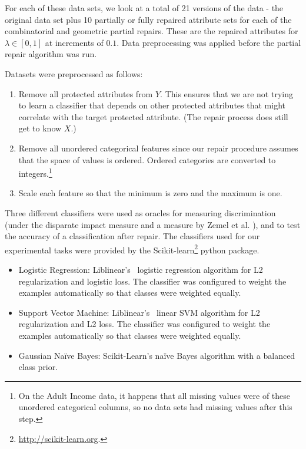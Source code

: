 For each of these data sets, we look at a total of 21 versions of the data - the original data set plus 10 partially or fully repaired attribute sets for each of the combinatorial and geometric partial repairs.  These are the repaired attributes for $\lambda \in [0,1]$ at increments of $0.1$.  Data preprocessing was applied before the partial repair algorithm was run.

\vspace*{0.1in} Datasets were preprocessed as follows:
\begin{enumerate}
\item Remove all protected attributes from $Y$. This ensures that we are not trying to learn a classifier that depends on other protected attributes that might correlate with the target protected attribute.  (The repair process does still get to know $X$.)
\item Remove all unordered categorical features since our repair procedure assumes that the space of values is ordered.  Ordered categories are converted to integers.\footnote{On the Adult Income data, it happens that all missing values were of these unordered categorical columns, so no data sets had missing values after this step.}
\item Scale each feature so that the minimum is zero and the maximum is one.
\end{enumerate}

\vspace*{0.1in} Three different classifiers were used as oracles for measuring discrimination (under the disparate impact measure and a measure by Zemel et al. \cite{icml2013_zemel13}), and to test the accuracy of a classification after repair.  The classifiers used for our experimental tasks were provided by the Scikit-learn\footnote{\url{http://scikit-learn.org}.} python package. 
\begin{itemize}
\item [LR:] Logistic Regression: Liblinear's~\cite{fan2008liblinear} logistic regression algorithm for L2 regularization and logistic loss. The classifier was configured to weight the examples automatically so that classes were weighted equally.
\item [SVM:] Support Vector Machine: Liblinear's~\cite{fan2008liblinear} linear SVM algorithm for L2 regularization and L2 loss. The classifier was configured to weight the examples automatically so that classes were weighted equally.
\item [GNB:] Gaussian Na\"ive Bayes: Scikit-Learn's na\"ive Bayes algorithm with a balanced class prior. 
\end{itemize}

